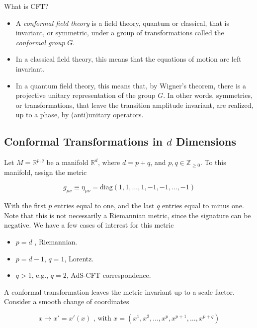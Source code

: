 \documentclass[10pt]{article}
\begin{document}
\noindent What is CFT?

\begin{itemize}
\item A \textit{conformal field theory} is a field theory, quantum or classical, that is invariant, or symmetric, under a group of transformations called the \textit{conformal group} $G$.
\item In a classical field theory, this means that the equations of motion are left invariant.
\item In a quantum field theory, this means that, by Wigner's theorem, there is a projective unitary representation of the group $G$. In other words, symmetries, or transformations, that leave the transition amplitude invariant, are realized, up to a phase, by (anti)unitary operators.
\end{itemize}

\subsection*{Conformal Transformations in $d$ Dimensions}

\noindent Let $M = \mathbb{R}^{p,q}$ be a manifold $\mathbb{R}^d$, where $d = p+q$, and $p,q \in \mathbb{Z}_{\ge 0}$. To this manifold, assign the metric

\begin{equation}
g_{\mu\nu} \equiv \eta_{\mu\nu} = \text{diag} (1,1,\dots,1,-1,-1,\dots,-1)
\end{equation}

\noindent With the first $p$ entries equal to one, and the last $q$ entries equal to minus one. Note that this is not necessarily a Riemannian metric, since the signature can be negative. We have a few cases of interest for this metric

\begin{itemize}
\item $p=d$ , Riemannian.
\item $p = d-1$, $q=1$, Lorentz.
\item $q > 1$, e.g., $q=2$, AdS-CFT correspondence.
\end{itemize}

\noindent A conformal transformation leaves the metric invariant up to a scale factor. Consider a smooth change of coordinates

\begin{equation}
x \rightarrow x' = x' (x) \text{ , with } x = (x^1, x^2, \dots, x^p, x^{p+1}, \dots, x^{p+q})
\end{equation}
\end{document}
